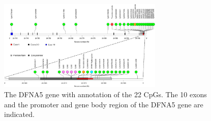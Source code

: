 \documentclass[10pt]{extarticle}
\begin{document}
\begin{figure}[h]
    \centering
    \includegraphics[width=0.7\textwidth]{Figures/The DFNA5 gene with annotation of the 22 CpGs..jpg} %
    \caption{The DFNA5 gene with annotation of the 22 CpGs. The 10 exons and the promoter and gene body region of the DFNA5 gene are indicated.}
    \label{fig:22CpG}
\end{figure}

\printbibliography
\end{document}
